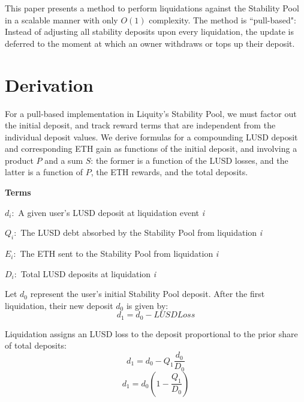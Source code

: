\documentclass[reqno]{article}
\begin{document}
This paper presents a method to perform liquidations against the Stability Pool in a scalable manner with only $O(1)$ complexity. The method is ``pull-based": Instead of adjusting all stability deposits upon every liquidation, the update is deferred to the moment at which an owner withdraws or tops up their deposit.

\section{Derivation}
For a pull-based implementation in Liquity’s Stability Pool, we must factor out the initial deposit, and track reward terms that are independent from the individual deposit values. We derive formulas for a compounding LUSD deposit and corresponding ETH gain as functions of the initial deposit, and involving a product $P$ and a sum $S$: the former is a function of the LUSD losses, and the latter is a function of $P$, the ETH rewards, and the total deposits.

\bigskip
\raggedright %

\textbf{Terms}
\begin{terms}
    \item $d_i:$ A given user’s LUSD deposit at liquidation event \textit{i}\\
    \item $Q_i:$ The LUSD debt absorbed by the Stability Pool from liquidation \textit{i}\\
    \item $E_i:$ The ETH sent to the Stability Pool from liquidation \textit{i}\\
    \item $D_i:$ Total LUSD deposits at liquidation \textit{i}
\end{terms}

\bigskip
Let $d_0$ represent the user’s initial Stability Pool deposit. After the first liquidation, their new
deposit $d_0$ is given by:\\
\begin{equation} 
    d_1=d_0-LUSDLoss
\end{equation}

\bigskip
Liquidation assigns an LUSD loss to the deposit proportional to the prior share of total deposits:
\begin{equation} \label{eq:2}
    d_1=d_0-Q_1\frac{d_0}{D_0}
\end{equation}
\begin{equation} 
    d_1=d_0\left(1-\frac{Q_1}{D_0}\right)
\end{equation}
\end{document}
